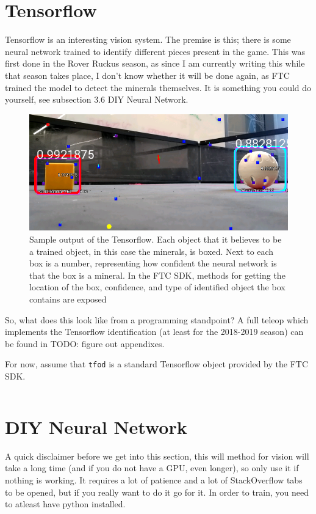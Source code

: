 \documentclass[../main.tex]{subfiles}
\begin{document}
\section{Tensorflow}
Tensorflow is an interesting vision system. The premise is this; there is some neural network trained to identify different pieces present in the game. This was first done in the Rover Ruckus season, as since I am currently writing this while that season takes place, I don't know whether it will be done again, as FTC trained the model to detect the minerals themselves. It is something you could do yourself, see subsection 3.6 DIY Neural Network. 
\begin{figure}[H]
    \centering
    \includegraphics[width=400pt]{sections/vision/images/tensorflowOutput.png}
    \caption{Sample output of the Tensorflow. Each object that it believes to be a trained object, in this case the minerals, is boxed. Next to each box is a number, representing how confident the neural network is that the box is a mineral. In the FTC SDK, methods for getting the location of the box, confidence, and type of identified object the box contains are exposed}
\end{figure}

So, what does this look like from a programming standpoint? A full teleop which implements the Tensorflow identification (at least for the 2018-2019 season) can be found in TODO: figure out appendixes.

For now, assume that \verb|tfod| is a standard Tensorflow object provided by the FTC SDK.

\begin{lstlisting}[language=Java]
\end{lstlisting}

\section{DIY Neural Network}
A quick disclaimer before we get into this section, this will method for vision will take a long time (and if you do not have a GPU, even longer), so only use it if nothing is working. It requires a lot of patience and a lot of StackOverflow tabs to be opened, but if you really want to do it go for it. In order to train, you need to atleast have python installed.
\end{document}
